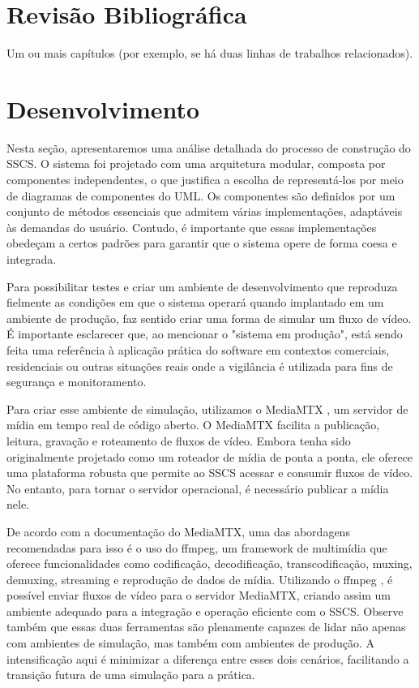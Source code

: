 \documentclass[12pt, %
openright, 
oneside, %
a4paper,    %
brazil]{facom-ufu-abntex2}
\begin{document}

\chapter{Revisão Bibliográfica}
Um ou mais capítulos (por exemplo, se há duas linhas de trabalhos
relacionados).

\chapter{Desenvolvimento}

Nesta seção, apresentaremos uma análise detalhada do processo de construção do
SSCS. O sistema foi projetado com uma arquitetura modular, composta por
componentes independentes, o que justifica a escolha de representá-los por meio
de diagramas de componentes do UML. Os componentes são definidos por um
conjunto de métodos essenciais que admitem várias implementações, adaptáveis às
demandas do usuário. Contudo, é importante que essas implementações obedeçam a
certos padrões para garantir que o sistema opere de forma coesa e integrada.

Para possibilitar testes e criar um ambiente de desenvolvimento que reproduza
fielmente as condições em que o sistema operará quando implantado em um
ambiente de produção, faz sentido criar uma forma de simular um fluxo de vídeo.
É importante esclarecer que, ao mencionar o "sistema em produção", está sendo
feita uma referência à aplicação prática do software em contextos comerciais,
residenciais ou outras situações reais onde a vigilância é utilizada para fins
de segurança e monitoramento.

Para criar esse ambiente de simulação, utilizamos o MediaMTX \cite{mediamtx},
um servidor de mídia em tempo real de código aberto. O MediaMTX facilita a
publicação, leitura, gravação e roteamento de fluxos de vídeo. Embora tenha
sido originalmente projetado como um roteador de mídia de ponta a ponta, ele
oferece uma plataforma robusta que permite ao SSCS acessar e consumir fluxos de
vídeo. No entanto, para tornar o servidor operacional, é necessário publicar a
mídia nele.

De acordo com a documentação do MediaMTX, uma das abordagens recomendadas para
isso é o uso do ffmpeg, um framework de multimídia que oferece funcionalidades
como codificação, decodificação, transcodificação, muxing, demuxing, streaming
e reprodução de dados de mídia. Utilizando o ffmpeg \cite{ffmpeg}, é possível
enviar fluxos de vídeo para o servidor MediaMTX, criando assim um ambiente
adequado para a integração e operação eficiente com o SSCS. Observe também que
essas duas ferramentas são plenamente capazes de lidar não apenas com ambientes
de simulação, mas também com ambientes de produção. A intensificação aqui é
minimizar a diferença entre esses dois cenários, facilitando a transição futura
de uma simulação para a prática.
\end{document}
